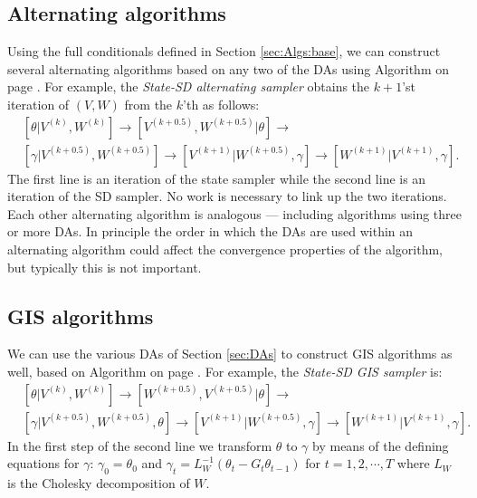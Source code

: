 \documentclass[12pt]{article}
\begin{document}
\subsection{Alternating algorithms}\label{sec:Algs:alt}
Using the full conditionals defined in Section \ref{sec:Algs:base}, we can construct several alternating algorithms based on any two of the DAs using Algorithm  on page \pageref{alg:Alt}. For example, the {\it State-SD alternating sampler} obtains the $k+1$'st iteration of $(V,W)$ from the $k$'th as follows:\vspace{-.3cm}
\begin{align*}
&[\theta|V^{(k)},W^{(k)}] \to [V^{(k+0.5)},W^{(k+0.5)}|\theta] \to\\
&[\gamma|V^{(k+0.5)},W^{(k+0.5)}] \to [V^{(k+1)}|W^{(k+0.5)},\gamma] \to [W^{(k+1)}|V^{(k+1)},\gamma].
\end{align*}
The first line is an iteration of the state sampler while the second line is an iteration of the SD sampler. No work is necessary to link up the two iterations. Each other alternating algorithm is analogous --- including algorithms using three or more DAs. In principle the order in which the DAs are used within an alternating algorithm could affect the convergence properties of the algorithm, but typically this is not important. 

\subsection{GIS algorithms}\label{sec:Algs:GIS}
We can use the various DAs of Section \ref{sec:DAs} to construct GIS algorithms as well, based on Algorithm  on page \pageref{alg:eGIS}. For example, the {\it State-SD GIS sampler} is: \vspace{-.3cm}
\begin{align*}
&[\theta|V^{(k)},W^{(k)}] \to [W^{(k+0.5)},V^{(k+0.5)}|\theta] \to\\
&[\gamma|V^{(k+0.5)},W^{(k+0.5)},\theta] \to [V^{(k+1)}|W^{(k+0.5)},\gamma] \to [W^{(k+1)}|V^{(k+1)},\gamma].
\end{align*}
In the first step of the second line we transform $\theta$ to $\gamma$ by means of the defining equations for $\gamma$: $\gamma_0=\theta_0$ and $\gamma_t = L_W^{-1}(\theta_t - G_t\theta_{t-1})$ for $t=1,2,\cdots,T$ where $L_W$ is the Cholesky decomposition of $W$. 
\end{document}
